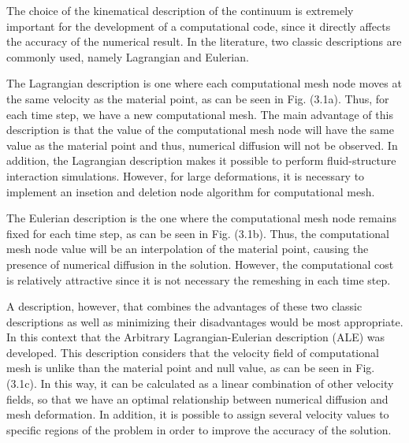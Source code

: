 The choice of the kinematical description of the continuum is 
extremely important for the development of a computational code, 
since it directly affects the accuracy of the numerical result. 
In the literature, two classic descriptions are commonly used, 
namely Lagrangian and Eulerian.

\medskip
The Lagrangian description is one where each computational mesh node 
moves at the same velocity as the material point, as can be seen in
 Fig. (3.1a). Thus, for each time step, we have a new computational mesh. 
The main advantage of this description is that the value of the 
computational mesh node will have the same value as the material point
 and thus, numerical diffusion will not be observed. In addition, 
the Lagrangian description makes it possible to perform 
fluid-structure interaction simulations. However, for large 
deformations, it is necessary to implement an insetion and deletion
node algorithm for computational mesh.

\medskip
The Eulerian description is the one where the computational mesh node 
remains fixed for each time step, as can be seen in Fig. (3.1b).
Thus, the computational mesh node value will be an interpolation 
of the material point, causing the presence of numerical diffusion 
in the solution. However, the computational cost is relatively 
attractive since it is not necessary the remeshing in each time step.

\medskip
A description, however, that combines the advantages of these two 
classic descriptions as well as minimizing their disadvantages would be
most appropriate. In this context that the Arbitrary 
Lagrangian-Eulerian description (ALE) was developed. 
This description considers that the velocity field of computational 
mesh is unlike than the material point and null value, as can be seen 
in Fig. (3.1c). In this way, it can be calculated as a 
linear combination of other velocity fields, so that we have an 
optimal relationship between numerical diffusion and mesh deformation. 
In addition, it is possible to assign several velocity values to 
specific regions of the problem in order to improve the 
accuracy of the solution.



